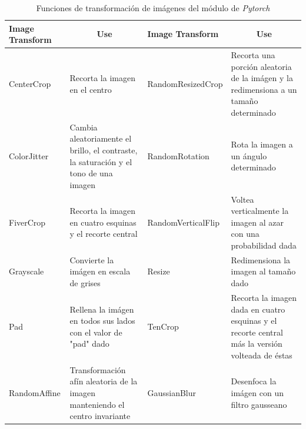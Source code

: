 			\begin{table}[ht]
				\centering
				\begin{tabular}{|p{4cm}|p{4cm}|p{4cm}|p{4cm}|}
					\hline
					Image Transform       & \multicolumn{1}{c|}{Use}                                                               & Image Transform       & \multicolumn{1}{c|}{Use}                                                                        \\ \hline
					CenterCrop            & Recorta la imagen en el centro                                                         & RandomResizedCrop     & Recorta una porción aleatoria de la imágen y la redimensiona a un tamaño determinado            \\ \hline
					ColorJitter           & Cambia aleatoriamente el brillo, el contraste, la saturación y el tono de una imagen   & RandomRotation        & Rota la imagen a un ángulo determinado                                                          \\ \hline
					FiverCrop              & Recorta la imagen en cuatro esquinas y el recorte central                              & RandomVerticalFlip    & Voltea verticalmente la imagen al azar con una probabilidad dada                                \\ \hline
					Grayscale             & Convierte la imágen en escala de grises                                                & Resize                & Redimensiona la imagen al tamaño dado                                                           \\ \hline
					Pad                   & Rellena la imágen en todos sus lados con el valor de "pad" dado                        & TenCrop               & Recorta la imagen dada en cuatro esquinas y el recorte central más la versión volteada de éstas \\ \hline
					RandomAffine          & Transformación afín aleatoria de la imagen manteniendo el centro invariante            & GaussianBlur          & Desenfoca la imágen con un filtro gausseano                                                                                                                                                     \\ \hline
				\end{tabular}
				\caption{Funciones de transformación de imágenes del módulo de \textit{Pytorch}}
				\label{table:Filters1}
			\end{table}
			
